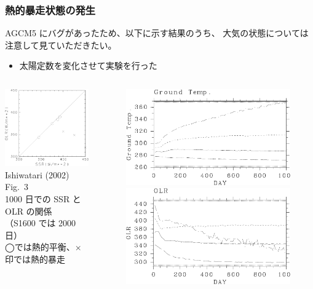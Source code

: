 \documentclass[aspectratio=149,9pt,fleqn]{beamer}
\begin{document}
\begin{frame}
	\frametitle{熱的暴走状態の発生}
	{\scriptsize
		AGCM5 にバグがあったため、以下に示す結果のうち、
		大気の状態については注意して見ていただきたい。
	}
	\begin{itemize}
		\item 太陽定数を変化させて実験を行った
	\end{itemize}
	\begin{columns}[b,onlytextwidth]
		\begin{column}{.3\textwidth}
			\centering\scriptsize
			\includegraphics[width=.7\textwidth]{./fig/ISR-OLR.kps-crop.pdf}\\
			Ishiwatari \etal (2002) Fig.~3\\
			1000 日での SSR と OLR の関係\\
			（S1600 では 2000 日）\\
			◯では熱的平衡、×印では熱的暴走
		\end{column}
		\begin{column}{.7\textwidth}
			\begin{figure}
				\scriptsize
				\includegraphics[width=.48\textwidth]{./fig/Tg-seqs.kps-crop.pdf}
				\includegraphics[width=.48\textwidth]{./fig/OLR-seqs.kps-crop.pdf}\\

\end{figure}
\end{column}
\end{columns}
\end{frame}
\end{document}
